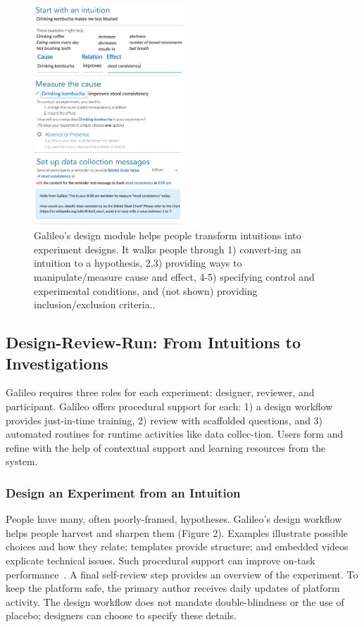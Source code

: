 \begin{figure}
  \centering
  \includegraphics[width=0.5\textwidth]{figures/galileo/galileo-2-design}
  \caption[Galileo’s design module helps people transform intuitions into experiment designs]
{Galileo’s design module helps people transform intuitions into experiment designs. It walks people through 1) convert-ing an intuition to a hypothesis, 2,3) providing ways to manipulate/measure cause and effect, 4-5) specifying control and experimental conditions, and (not shown) providing inclusion/exclusion criteria..}
  \label{fig:galileo-2}
\end{figure}

\subsection{Design-Review-Run: From Intuitions to Investigations}
Galileo requires three roles for each experiment: designer, reviewer, and participant. Galileo offers procedural support for each: 1) a design workflow provides just-in-time training, 2) review with scaffolded questions, and 3) automated routines for runtime activities like data collec-tion. Users form and refine with the help of contextual support and learning resources from the system. 

\subsubsection{Design an Experiment from an Intuition}
People have many, often poorly-framed, hypotheses. Galileo’s design workflow helps people harvest and sharpen them (Figure 2). Examples illustrate possible choices and how they relate; templates provide structure; and embedded videos explicate technical issues. Such procedural support can improve on-task performance~\cite{Pandey2018}. A final self-review step provides an overview of the experiment. To keep the platform safe, the primary author receives daily updates of platform activity. The design workflow does not mandate double-blindness or the use of placebo; designers can choose to specify these details.

